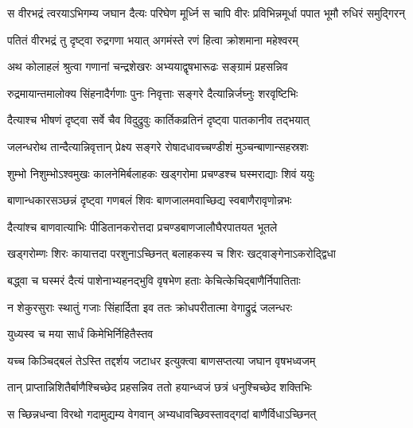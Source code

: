 \twolineshloka
{स वीरभद्रं त्वरयाऽभिगम्य जघान दैत्यः परिघेण मूर्ध्नि}
{स चापि वीरः प्रविभिन्नमूर्धा पपात भूमौ रुधिरं समुद्गिरन्} %





\twolineshloka
{पतितं वीरभद्रं तु दृष्ट्वा रुद्रगणा भयात्}
{अगमंस्ते रणं हित्वा क्रोशमाना महेश्वरम्} %

\twolineshloka
{अथ कोलाहलं श्रुत्वा गणानां चन्द्रशेखरः}
{अभ्ययाद्वृषभारूढः सङ्ग्रामं प्रहसन्निव} %

\twolineshloka
{रुद्रमायान्तमालोक्य सिंहनादैर्गणाः पुनः}
{निवृत्ताः सङ्गरे दैत्यान्निर्जघ्नुः शरवृष्टिभिः} %

\twolineshloka
{दैत्याश्च भीषणं दृष्ट्वा सर्वे चैव विदुद्रुवुः}
{कार्तिकव्रतिनं दृष्ट्वा पातकानीव तद्भयात्} %

\twolineshloka
{जलन्धरोथ तान्दैत्यान्निवृत्तान् प्रेक्ष्य सङ्गरे}
{रोषादधावच्चण्डीशं मुञ्चन्बाणान्सहस्रशः} %

\twolineshloka
{शुम्भो निशुम्भोऽश्वमुखः कालनेमिर्बलाहकः}
{खड्गरोमा प्रचण्डश्च घस्मराद्याः शिवं ययुः} %

\twolineshloka
{बाणान्धकारसञ्छन्नं दृष्ट्वा गणबलं शिवः}
{बाणजालमवाच्छिद्य स्वबाणैरावृणोन्नभः} %

\twolineshloka
{दैत्यांश्च बाणवात्याभिः पीडितानकरोत्तदा}
{प्रचण्डबाणजालौघैरपातयत भूतले} %

\twolineshloka
{खड्गरोम्णः शिरः कायात्तदा परशुनाऽच्छिनत्}
{बलाहकस्य च शिरः खट्वाङ्गेनाऽकरोद्द्विधा} %

\twolineshloka
{बद्ध्वा च घस्मरं दैत्यं पाशेनाभ्यहनद्भुवि}
{वृषभेण हताः केचित्केचिद्बाणैर्निपातिताः} %

\twolineshloka
{न शेकुरसुराः स्थातुं गजाः सिंहार्दिता इव}
{ततः क्रोधपरीतात्मा वेगाद्रुद्रं जलन्धरः} %




\onelineshloka
{युध्यस्व च मया सार्धं किमेभिर्निहितैस्तव} %

\twolineshloka
{यच्च किञ्चिद्बलं तेऽस्ति तद्दर्शय जटाधर}
{इत्युक्त्वा बाणसप्तत्या जघान वृषभध्वजम्} %

\twolineshloka
{तान् प्राप्तान्निशितैर्बाणैश्चिच्छेद प्रहसन्निव}
{ततो हयान्ध्वजं छत्रं धनुश्चिच्छेद शक्तिभिः} %

\twolineshloka
{स च्छिन्नधन्वा विरथो गदामुद्यम्य वेगवान्}
{अभ्यधावच्छिवस्तावद्गदां बाणैर्विधाऽच्छिनत्} %

